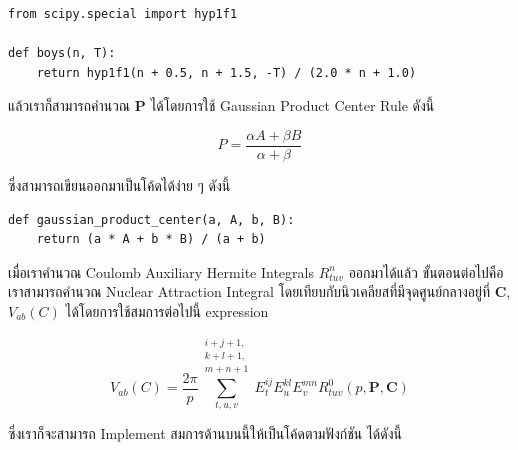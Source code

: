 \begin{lstlisting}[style=MyPython]
from scipy.special import hyp1f1

def boys(n, T):
    return hyp1f1(n + 0.5, n + 1.5, -T) / (2.0 * n + 1.0)
\end{lstlisting}

\vspace{5pt}

\noindent แล้วเราก็สามารถคำนวณ $\mathbf{P}$ ได้โดยการใช้ Gaussian Product Center Rule ดังนี้

\begin{equation}
  P
  =
  \frac{\alpha A + \beta B}{\alpha + \beta}
\end{equation}

\noindent ซึ่งสามารถเขียนออกมาเป็นโค้ดได้ง่าย ๆ ดังนี้

\vspace{5pt}

\begin{lstlisting}[style=MyPython]
def gaussian_product_center(a, A, b, B):
    return (a * A + b * B) / (a + b)
\end{lstlisting}

\vspace{5pt}

เมื่อเราคำนวณ Coulomb Auxiliary Hermite Integrals $R^{n}_{tuv}$ ออกมาได้แล้ว ขั้นตอนต่อไปคือเราสามารถคำนวณ Nuclear 
Attraction Integral โดยเทียบกับนิวเคลียสที่มีจุดศูนย์กลางอยู่ที่ $\mathbf{C}$, $V_{ab}(C)$ ได้โดยการใช้สมการต่อไปนี้
expression

\begin{equation}
  V_{ab}(C)
  =
  \frac{2\pi}{p}
  \sum\limits_{t,u,v}^{\substack{i+j+1,\\k+l+1,\\m+n+1}}
  E_t^{ij} E_u^{kl} E_v^{mn} R^0_{tuv}(p,\mathbf{P},\mathbf{C})
\end{equation}

\noindent ซึ่งเราก็จะสามารถ Implement สมการด้านบนนี้ให้เป็นโค้ดตามฟังก์ชัน  ได้ดังนี้

\vspace{5pt}

